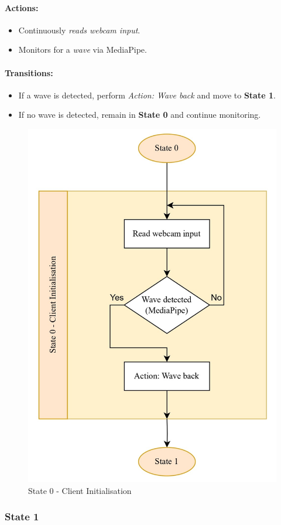 \documentclass[conference]{IEEEtran}
\begin{document}
\paragraph{Actions:}
\begin{itemize}
  \item Continuously \emph{reads webcam input}.
  \item Monitors for a \emph{wave} via MediaPipe.
\end{itemize}

\paragraph{Transitions:}
\begin{itemize}
  \item If a wave is detected, perform \emph{Action: Wave back} and move to \textbf{State 1}.
  \item If no wave is detected, remain in \textbf{State 0} and continue monitoring.
\end{itemize}

\begin{figure}
    \centering
    \includegraphics[width=.6\linewidth]{State 0 - Client Initialisation.jpg}
    \caption{State 0 - Client Initialisation}
    \label{State 0 - Client Initialisation}
\end{figure}

\subsubsection{State 1}
\end{document}
